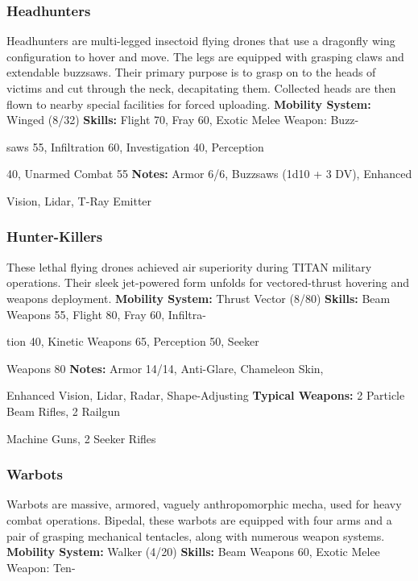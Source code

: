 \subsubsection{Headhunters}

Headhunters are multi-legged insectoid flying drones 
that use a dragonfly wing configuration to hover and 
move. The legs are equipped with grasping claws 
and extendable buzzsaws. Their primary purpose is 
to grasp on to the heads of victims and cut through 
the neck, decapitating them. Collected heads are then 
flown to nearby special facilities for forced uploading. 
\textbf{Mobility System: }Winged (8/32)
\textbf{Skills:} Flight 70, Fray 60, Exotic Melee Weapon: Buzz-

saws 55, Infiltration 60, Investigation 40, Perception 

40, Unarmed Combat 55
\textbf{Notes:} Armor 6/6, Buzzsaws (1d10 + 3 DV), Enhanced 

Vision, Lidar, T-Ray Emitter

\subsubsection{Hunter-Killers}

These\textbf{  }lethal\textbf{  }flying drones achieved air superiority 
during TITAN military operations. Their sleek jet-powered
form unfolds for vectored-thrust hovering
and weapons deployment.
\textbf{Mobility System: }Thrust Vector (8/80)
\textbf{Skills:} Beam Weapons 55, Flight 80, Fray 60, Infiltra-

tion 40, Kinetic Weapons 65, Perception 50, Seeker 

Weapons 80
\textbf{Notes:} Armor 14/14, Anti-Glare, Chameleon Skin, 

Enhanced Vision, Lidar, Radar, Shape-Adjusting 
\textbf{Typical Weapons:} 2 Particle Beam Rifles, 2 Railgun 

Machine Guns, 2 Seeker Rifles

\subsubsection{Warbots}

Warbots are massive, armored, vaguely anthropomorphic
mecha, used for heavy combat operations.
Bipedal, these warbots are equipped with four arms 
and a pair of grasping mechanical tentacles, along 
with numerous weapon systems.
\textbf{Mobility System: }Walker (4/20)
\textbf{Skills:} Beam Weapons 60, Exotic Melee Weapon: Ten-

